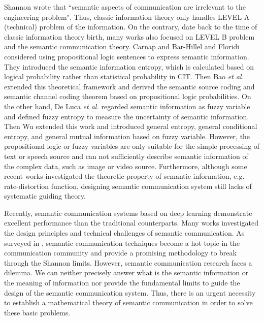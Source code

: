 \documentclass[12pt, draftclsnofoot,onecolumn]{IEEEtran}
\begin{document}
Shannon \cite{Classicpaper_Shannon} wrote that ``semantic aspects of communication are irrelevant to the engineering problem". Thus, classic information theory only handles LEVEL A (technical) problem of the information. On the contrary, date back to the time of classic information theory birth, many works also focused on LEVEL B problem and the semantic communication theory. Carnap and Bar-Hillel \cite{Semantic_Carnap} and Floridi \cite{Semantic_Floridi} considered using propositional logic sentences to express semantic information. They introduced the semantic information entropy, which is calculated based on logical probability \cite{Logic_Nilsson} rather than statistical probability in CIT. Then Bao \emph{et al.} \cite{Semantic_Bao} extended this theoretical framework and derived the semantic source coding and semantic channel coding theorem based on propositional logic probabilities. On the other hand, De Luca \emph{et al.} \cite{Entropy_Luca} \cite{Fuzzy_Luca} regarded semantic information as fuzzy variable and defined fuzzy entropy to measure the uncertainty of semantic information. Then Wu \cite{Wuweiling} extended this work and introduced general entropy, general conditional entropy, and general mutual information based on fuzzy variable. However, the propositional logic or fuzzy variables are only suitable for the simple processing of text or speech source and can not sufficiently describe semantic information of the complex data, such as image or video source. Furthermore, although some recent works \cite{RateD_Liu, SideInfo_Guo, Theory_Shao, Theory_Tang} investigated the theoretic property of semantic information, e.g. rate-distortion function,  designing semantic communication system still lacks of systematic guiding theory.

Recently, semantic communication systems based on deep learning demonstrate excellent performance than the traditional counterparts. Many works \cite{Semantic_ZhangPing, Survey_Shi, Survey_Qin, Survey_Xie} investigated the design principles and technical challenges of semantic communication. As surveyed in \cite{Survey_Gunduz, Semantic_Niu}, semantic communication techniques become a hot topic in the communication community and provide a promising methodology to break through the Shannon limits. However, semantic communication research faces a dilemma. We can neither precisely answer what is the semantic information or the meaning of information nor provide the fundamental limits to guide the design of the semantic communication system. Thus, there is an urgent necessity to establish a mathematical theory of semantic communication in order to solve these basic problems.
\end{document}
